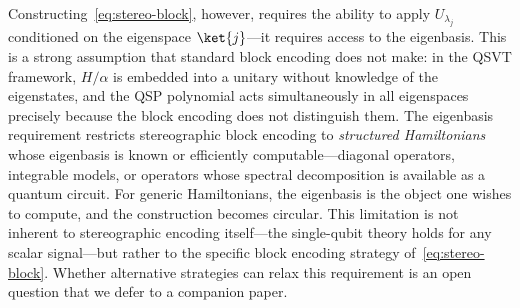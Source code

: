 Constructing~\eqref{eq:stereo-block}, however, requires the
ability to apply $U_{\lambda_j}$ conditioned on the eigenspace
$\ket{j}$---it requires access to the eigenbasis.  This is a
strong assumption that standard block encoding does not make: in
the QSVT framework, $H/\alpha$ is embedded into a unitary
without knowledge of the eigenstates, and the QSP polynomial
acts simultaneously in all eigenspaces precisely because the
block encoding does not distinguish them.  The eigenbasis
requirement restricts stereographic block encoding to
\emph{structured Hamiltonians} whose eigenbasis is known or
efficiently computable---diagonal operators, integrable models,
or operators whose spectral decomposition is available as a
quantum circuit.  For generic Hamiltonians, the eigenbasis is
the object one wishes to compute, and the construction becomes
circular.  This limitation is not inherent to stereographic
encoding itself---the single-qubit theory holds for any scalar
signal---but rather to the specific block encoding strategy
of~\eqref{eq:stereo-block}.  Whether alternative strategies can
relax this requirement is an open question that we defer to a
companion paper.

